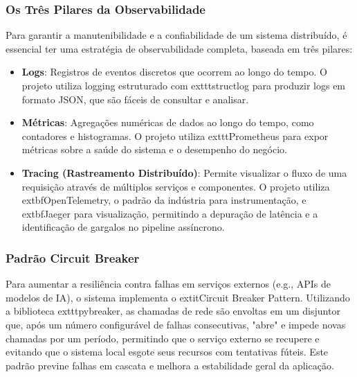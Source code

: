 \subsubsection{Os Três Pilares da Observabilidade}
Para garantir a manutenibilidade e a confiabilidade de um sistema distribuído, é essencial ter uma estratégia de observabilidade completa, baseada em três pilares:
\begin{itemize}
    \item \textbf{Logs}: Registros de eventos discretos que ocorrem ao longo do tempo. O projeto utiliza logging estruturado com 	exttt{structlog} para produzir logs em formato JSON, que são fáceis de consultar e analisar.
    \item \textbf{Métricas}: Agregações numéricas de dados ao longo do tempo, como contadores e histogramas. O projeto utiliza 	exttt{Prometheus} para expor métricas sobre a saúde do sistema e o desempenho do negócio.
    \item \textbf{Tracing (Rastreamento Distribuído)}: Permite visualizar o fluxo de uma requisição através de múltiplos serviços e componentes. O projeto utiliza 	extbf{OpenTelemetry}, o padrão da indústria para instrumentação, e 	extbf{Jaeger} para visualização, permitindo a depuração de latência e a identificação de gargalos no pipeline assíncrono.
\end{itemize}

\subsubsection{Padrão Circuit Breaker}
Para aumentar a resiliência contra falhas em serviços externos (e.g., APIs de modelos de IA), o sistema implementa o 	extit{Circuit Breaker Pattern}. Utilizando a biblioteca 	exttt{pybreaker}, as chamadas de rede são envoltas em um disjuntor que, após um número configurável de falhas consecutivas, "abre" e impede novas chamadas por um período, permitindo que o serviço externo se recupere e evitando que o sistema local esgote seus recursos com tentativas fúteis. Este padrão previne falhas em cascata e melhora a estabilidade geral da aplicação.
